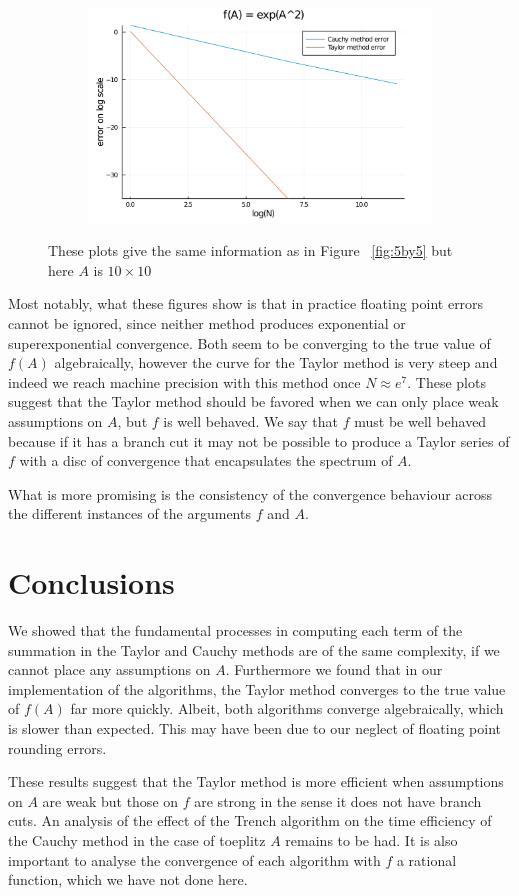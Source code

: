 \documentclass{article}
\begin{document}
\begin{figure}
\begin{subfigure}[b]{0.3 \linewidth}
        \includegraphics[width = \textwidth]
        {expA^2.jpg}
        \caption{}
        \label{}
    \end{subfigure}
    \caption[LoF entry]{These plots give the same information as in Figure ~\ref{fig:5by5} but here $A$ is $10 \times 10$}
    \label{fig:10by10}
\end{figure}



Most notably, what these figures show is that in practice floating point errors cannot be ignored, since neither method produces exponential or superexponential convergence. Both seem to be converging to the true value of $f(A)$ algebraically, however the curve for the Taylor method is very steep and indeed we reach machine precision with this method once $N \approx e^7$. These plots suggest that the Taylor method should be favored when we can only place weak assumptions on $A$, but $f$ is well behaved. We say that $f$ must be well behaved because if it has a branch cut it may not be possible to produce a Taylor series of $f$ with a disc of convergence that encapsulates the spectrum of $A$.

What is more promising is the consistency of the convergence behaviour across the different instances of the arguments $f$ and $A$.
\section*{Conclusions}
We showed that the fundamental processes in computing each term of the summation in the Taylor and Cauchy methods are of the same complexity, if we cannot place any assumptions on $A$. Furthermore we found that in our implementation of the algorithms, the Taylor method converges to the true value of $f(A)$ far more quickly. Albeit, both algorithms converge algebraically, which is slower than expected. This may have been due to our neglect of floating point rounding errors.

These results suggest that the Taylor method is more efficient when assumptions on $A$ are weak but those on $f$ are strong in the sense it does not have branch cuts. An analysis of the effect of the Trench algorithm on the time efficiency of the Cauchy method in the case of toeplitz $A$ remains to be had. It is also important to analyse the convergence of each algorithm with $f$ a rational function, which we have not done here.

\printbibliography
\end{document}
